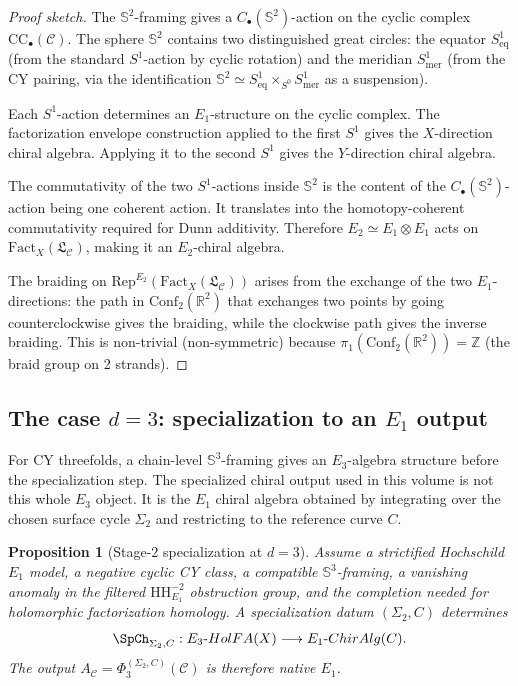 \documentclass[11pt]{article}
\theoremstyle{plain}
\newtheorem{proposition}[theorem]{Proposition}
\theoremstyle{definition}
\theoremstyle{remark}
\newcommand{\Eone}{E_1}
\newcommand{\Etwo}{E_2}
\newcommand{\Rep}{\mathrm{Rep}}
\newcommand{\HH}{\mathrm{HH}}
\newcommand{\Fact}{\mathrm{Fact}}
\newcommand{\cC}{\mathcal{C}}
\newcommand{\frakL}{\mathfrak{L}}
\begin{document}
\begin{proof}[Proof sketch]
The $\mathbb{S}^2$-framing gives a $C_\bullet(\mathbb{S}^2)$-action on the cyclic complex $\mathrm{CC}_\bullet(\cC)$. The sphere $\mathbb{S}^2$ contains two distinguished great circles: the equator $S^1_{\mathrm{eq}}$ (from the standard $S^1$-action by cyclic rotation) and the meridian $S^1_{\mathrm{mer}}$ (from the CY pairing, via the identification $\mathbb{S}^2 \simeq S^1_{\mathrm{eq}} \times_{S^0} S^1_{\mathrm{mer}}$ as a suspension).

Each $S^1$-action determines an $\Eone$-structure on the cyclic
complex. The factorization envelope construction applied to the first
$S^1$ gives the $X$-direction chiral algebra. Applying it to the second
$S^1$ gives the $Y$-direction chiral algebra.

The commutativity of the two $S^1$-actions inside $\mathbb{S}^2$ is the
content of the $C_\bullet(\mathbb{S}^2)$-action being one coherent
action. It translates into the homotopy-coherent commutativity required
for Dunn additivity. Therefore $\Etwo \simeq \Eone \otimes \Eone$ acts
on $\Fact_X(\frakL_\cC)$, making it an $\Etwo$-chiral algebra.

The braiding on $\Rep^{\Etwo}(\Fact_X(\frakL_\cC))$ arises from the exchange of the two $\Eone$-directions: the path in $\mathrm{Conf}_2(\mathbb{R}^2)$ that exchanges two points by going counterclockwise gives the braiding, while the clockwise path gives the inverse braiding. This is non-trivial (non-symmetric) because $\pi_1(\mathrm{Conf}_2(\mathbb{R}^2)) = \mathbb{Z}$ (the braid group on 2 strands).
\end{proof}

\subsection{The case $d = 3$: specialization to an $\Eone$ output}
\label{sec:d3-case}

For CY threefolds, a chain-level $\mathbb{S}^3$-framing gives an
$E_3$-algebra structure before the specialization step. The
specialized chiral output used in this volume is not this whole
$E_3$ object. It is the $\Eone$ chiral algebra obtained by integrating
over the chosen surface cycle $\Sigma_2$ and restricting to the
reference curve $C$.

\begin{proposition}[Stage-$2$ specialization at $d = 3$]
\label{prop:e3-to-e2}
Assume a strictified Hochschild $\Eone$ model, a negative cyclic CY
class, a compatible $\mathbb{S}^3$-framing, a vanishing anomaly in the
filtered $\HH^{-2}_{\Eone}$ obstruction group, and the completion needed
for holomorphic factorization homology. A specialization datum
$(\Sigma_2,C)$ determines
\[
 \SpCh_{\Sigma_2,C}\colon E_3\text{-}\mathrm{HolFA}(X)
 \longrightarrow \Eone\text{-}\mathrm{ChirAlg}(C).
\]
The output $A_\cC=\Phi_3^{(\Sigma_2,C)}(\cC)$ is therefore native
$\Eone$.
\end{proposition}
\end{document}

